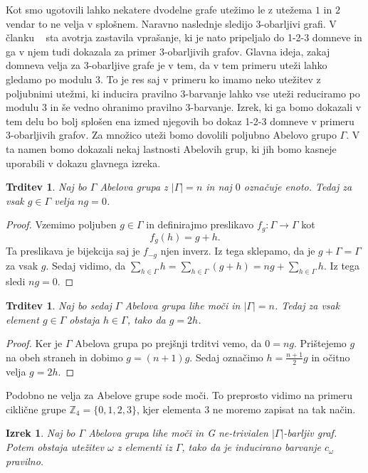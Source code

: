 \documentclass[12pt,a4paper,twoside]{article}
\theoremstyle{definition} %
\theoremstyle{plain} %
\newtheorem{izrek}[definicija]{Izrek}
\newtheorem{trditev}[definicija]{Trditev}
\numberwithin{equation}{section}  %
\begin{document}
 Kot smo ugotovili lahko nekatere dvodelne grafe utežimo le z utežema $1$ in $2$ vendar to ne velja v splošnem. Naravno naslednje sledijo $3$-obarljivi grafi. 
  V članku ~\citet{base}  sta  avotrja zastavila vprašanje, ki je nato pripeljalo do 1-2-3 domneve in ga v njem tudi dokazala za primer $3$-obarljivih grafov. Glavna ideja, zakaj domneva velja za 3-obarljive grafe je v tem, da v tem primeru uteži lahko gledamo po modulu 3. To je res saj v primeru ko imamo neko utežitev z poljubnimi utežmi, ki inducira pravilno 3-barvanje lahko vse uteži reduciramo po modulu 3 in še vedno ohranimo pravilno 3-barvanje. Izrek, ki ga bomo dokazali v tem delu bo bolj splošen ena izmed njegovih bo dokaz 1-2-3 domneve v primeru 3-obarljivih grafov. Za množico uteži bomo dovolili poljubno Abelovo grupo $\Gamma$. V ta namen bomo dokazali nekaj lastnosti Abelovih grup, ki jih bomo kasneje uporabili v dokazu glavnega izreka.
  \begin{trditev}
  	Naj bo $\Gamma$ Abelova grupa z $|\Gamma| = n$ in naj $0$ označuje enoto. Tedaj za vsak $g \in \Gamma$ velja $n g = 0$.
  \end{trditev}

\begin{proof}
	Vzemimo poljuben $g \in \Gamma$ in definirajmo preslikavo $f_g : \Gamma \rightarrow \Gamma$ kot
	$$f_g(h) = g + h .$$
	Ta preslikava je bijekcija saj je $f_{-g}$ njen inverz. Iz tega sklepamo, da je $ g + \Gamma = \Gamma$ za vsak $g$. Sedaj vidimo, da $ \sum_{h \in \Gamma} h = \sum_{h \in \Gamma} (g + h) = ng + \sum_{h \in \Gamma} h$. Iz tega sledi $ng = 0$.
\end{proof}


\begin{trditev}
	Naj bo sedaj $\Gamma$ Abelova grupa lihe moči in $|\Gamma| = n$. Tedaj za vsak element $g \in \Gamma$ obstaja $h \in \Gamma$, tako da $g = 2h$.
\end{trditev}

\begin{proof}
	Ker je $\Gamma$ Abelova grupa po prejšnji trditvi vemo, da $ 0 = ng$. Prištejemo $g$ na obeh straneh in dobimo $g = (n+1)g$. Sedaj označimo $h = \frac{n + 1}{2}g$ in očitno velja $g = 2h$.
\end{proof}

Podobno ne velja za Abelove grupe sode moči. To preprosto vidimo na primeru ciklične grupe $\mathbb{Z}_4 = \{0,1,2,3\}$, kjer elementa $3$ ne moremo zapisat na tak način.


  \begin{izrek}
  	Naj bo $\Gamma$ Abelova grupa lihe moči in G ne-trivialen $|\Gamma|$-barljiv graf. Potem obstaja utežitev $\omega$ z elementi iz $\Gamma$, tako da je inducirano barvanje $c_{\omega}$ pravilno.
  \end{izrek}
\end{document}
